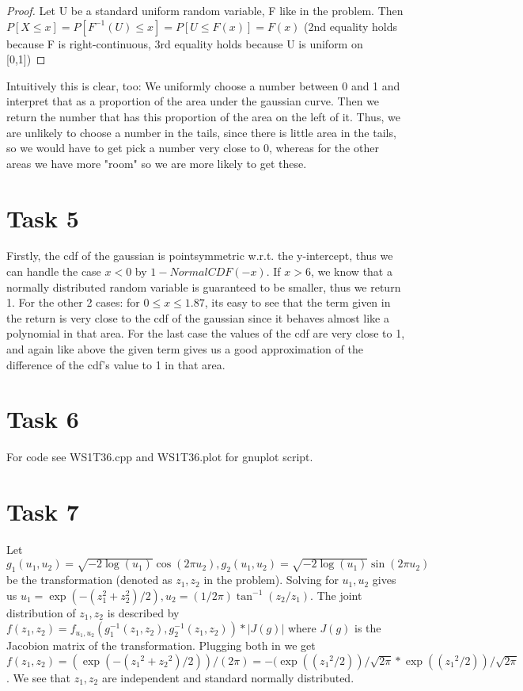 \documentclass[]{article}
\begin{document}
\begin{proof}
Let U be a standard uniform random variable, F like in the problem. Then
$P\left[X\le x\right]=P\left[F^{-1}(U) \le x\right]=P\left[U \le
F(x)\right]=F(x)$ (2nd equality holds because F is right-continuous, 3rd
equality holds because U is uniform on [0,1])
\end{proof}

Intuitively this is clear, too: We uniformly choose a number between 0 and 1 and
interpret that as a proportion of the area under the gaussian curve. Then we
return the number that has this proportion of the area on the left of it. Thus,
we are unlikely to choose a number in the tails, since there is little area in
the tails, so we would have to get pick a number very close to 0, whereas for
the other areas we have more "room" so we are more likely to get these.

\section*{Task 5} Firstly, the cdf of the gaussian is pointsymmetric w.r.t. the
y-intercept, thus we can handle the case $x<0$ by $1-NormalCDF(-x)$. If $x>6$,
we know that a normally distributed random variable is guaranteed to be smaller,
thus we return 1. For the other 2 cases: for $0\le x\le 1.87$, its easy to see
that the term given in the return is very close to the cdf of the gaussian since
it behaves almost like a polynomial in that area. For the last case the values
of the cdf are very close to 1, and again like above the given term gives us a
good approximation of the difference of the cdf's value to 1 in that area.

\section*{Task 6} For code see WS1T36.cpp and WS1T36.plot for gnuplot script.

\section*{Task 7} Let $g_1(u_1,u_2)=\sqrt{-2\log(u_1)}\cos(2\pi
u_2),g_2(u_1,u_2)=\sqrt{-2\log(u_1)}\sin(2\pi u_2)$ be the transformation
(denoted as $z_1, z_2$ in the problem). Solving for $u_1,u_2$ gives us $u_1 =
\exp({-(z_1 ^2+ z_2 ^2)/2}),u_2 = (1/2\pi)\tan^{-1} (z_2/z_1)$. The joint
distribution of $z_1, z_2$ is described by $ f(z_1 ,z_2) = f_{u_1,
u_2}(g_1^{-1}(z_1,z_2),g_2^{-1}(z_1,z_2)) * | J(g) |$ where $J(g)$ is the
Jacobion matrix of the transformation. Plugging both in we get
$f(z_1,z_2)=(\exp(-({z_1}^2+{z_2}^2)/2))/(2\pi)=-(\exp(({z_1}^2/2))/\sqrt{2\pi}*\exp(({z_1}^2/2))/\sqrt{2\pi}$.
We see that $z_1,z_2$ are independent and standard normally distributed.
\end{document}
